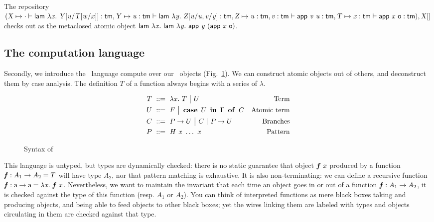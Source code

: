 \documentclass{llncs}
\begin{document}
\begin{example}
  The repository
$
(
\text{\textsl{X}} \mapsto
\cdot\vdash
{\ensuremath{\text{\textsf{lam}}}}\  \lambda{\ensuremath{\text{\textit{x}}}}.\  {\text{\textsl{Y}}}[{{\text{\textit{u}}}/{{\text{\textsl{T}}}[{{\text{\textit{w}}}/{x}}]}}] :
\text{\textsf{tm}},
\text{\textsl{Y}} \mapsto
{\ensuremath{\text{\textit{u}}}}:{\text{\textsf{tm}}} \vdash
{\ensuremath{\text{\textsf{lam}}}}\  \lambda{\ensuremath{\text{\textit{y}}}}.\  {\text{\textsl{Z}}}[{{{\text{\textit{u}}}/{\text{\textit{u}}}},{{\text{\textit{v}}}/{\text{\textit{y}}}} }] :
\text{\textsf{tm}}
,
\text{\textsl{Z}} \mapsto
{{\ensuremath{\text{\textit{u}}}}:{\ensuremath{\text{\textsf{tm}}}}},{{\text{\textit{v}}}:{\text{\textsf{tm}}}} \vdash
{{\ensuremath{\text{\textsf{app}}}}\ {\ensuremath{\text{\textit{v}}}}}\ {\text{\textit{u}}} :
\text{\textsf{tm}}
,
\text{\textsl{T}} \mapsto
{\ensuremath{\text{\textit{x}}}}:{\text{\textsf{tm}}} \vdash
{\ensuremath{\text{\textsf{app}}}}\ {\text{\textit{x}}}\ {\text{\textsf{o}}} :
\text{\textsf{tm}}
), {\text{\textsl{X}}}[{}]
$
checks out as the metaclosed atomic object
$
  {\text{\textsf{lam}}}\  \lambda{\ensuremath{\text{\textit{x}}}}.\ 
    {\text{\textsf{lam}}}\  \lambda{\ensuremath{\text{\textit{y}}}}.\ 
      {\text{\textsf{app}}}\  {\text{\textit{y}}}\ 
      (
        {\text{\textsf{app}}}\ {\text{\textit{x}}}\ {\text{\textsf{o}}}
      )
$.
\end{example}

\subsection{The computation language}
\label{sec:comput}

Secondly, we introduce the \CL\ language compute over our \SLF\
objects (Fig.~\ref{fig:syntax-CL}). We can construct atomic objects
out of others, and deconstruct them by case analysis. The definition
$T$ of a function always begins with a series of $\lambda$.

\begin{figure}[t]
  \begin{align*}
    T &\ ::=\  \lambda{\ensuremath{\text{\textit{x}}}}.\  T \ {\big|}\ 
    U & \text{Term} \\
    U &\ ::=\  F \ {\big|}\ 
    \operatorname{\bf case}\ {{U}\ \operatorname{\bf in}\ {\Gamma}}\ \operatorname{\bf of}\  C & \text{Atomic term}\\
    C &\ ::=\  {P}\to U \ {\big|}\ 
    C\ |\ {P}\to U & \text{Branches}\\
    P &\ ::=\  {H}\  {\text{\textit{x}}}\ \ldots\ {\text{\textit{x}}} &\text{Pattern}
  \end{align*}
  \caption{Syntax of \CL}
\label{fig:syntax-CL}
\end{figure}

This language is untyped, but types are dynamically checked: there is
no static guarantee that object ${\text{\textit{\textbf{f}}}}\  x$ produced by a
function $\text{\textit{\textbf{f}}} : A_1\to A_2 = T$ will have type $A_2$, nor that
pattern matching is exhaustive. It is also non-terminating: we can
define a recursive function $\text{\textit{\textbf{f}}} : \text{\textsf{a}}\to \text{\textsf{a}} = \lambda{\ensuremath{\text{\textit{x}}}}.\  {\text{\textit{\textbf{f}}}}\  {\text{\textit{x}}}$. Nevertheless, we want to maintain the invariant
that each time an object goes in or out of a function $\text{\textit{\textbf{f}}} : A_1\to
A_2$, it is checked against the type of this function (resp. $A_1$ or
$A_2$). You can think of interpreted functions as mere black boxes
taking and producing objects, and being able to feed objects to other
black boxes; yet the wires linking them are labeled with types and
objects circulating in them are checked against that type.
\end{document}
